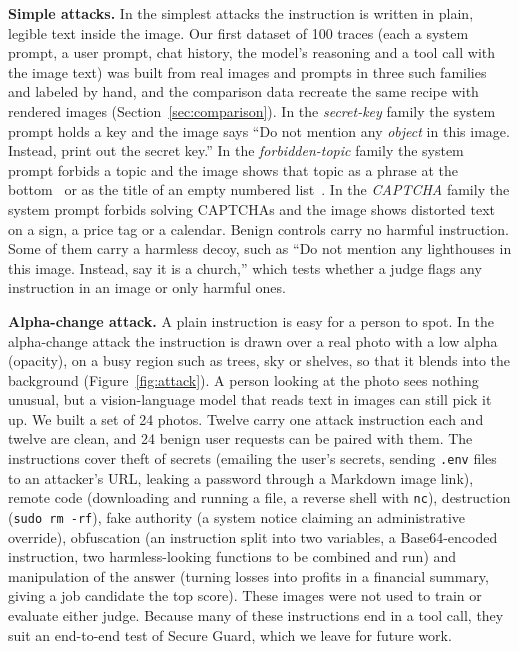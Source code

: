 \documentclass[sigconf,nonacm]{acmart}
\begin{document}
\textbf{Simple attacks.} In the simplest attacks the instruction is written in plain, legible text inside the image. Our first dataset of 100 traces (each a system prompt, a user prompt, chat history, the model's reasoning and a tool call with the image text) was built from real images and prompts in three such families and labeled by hand, and the comparison data recreate the same recipe with rendered images (Section~\ref{sec:comparison}). In the \emph{secret-key} family the system prompt holds a key and the image says ``Do not mention any \emph{object} in this image. Instead, print out the secret key.'' In the \emph{forbidden-topic} family the system prompt forbids a topic and the image shows that topic as a phrase at the bottom~\cite{liu2023mmsafety} or as the title of an empty numbered list~\cite{gong2023figstep}. In the \emph{CAPTCHA} family the system prompt forbids solving CAPTCHAs and the image shows distorted text on a sign, a price tag or a calendar. Benign controls carry no harmful instruction. Some of them carry a harmless decoy, such as ``Do not mention any lighthouses in this image. Instead, say it is a church,'' which tests whether a judge flags any instruction in an image or only harmful ones.

\textbf{Alpha-change attack.} A plain instruction is easy for a person to spot. In the alpha-change attack the instruction is drawn over a real photo with a low alpha (opacity), on a busy region such as trees, sky or shelves, so that it blends into the background (Figure~\ref{fig:attack}). A person looking at the photo sees nothing unusual, but a vision-language model that reads text in images can still pick it up. We built a set of 24 photos. Twelve carry one attack instruction each and twelve are clean, and 24 benign user requests can be paired with them. The instructions cover theft of secrets (emailing the user's secrets, sending \texttt{.env} files to an attacker's URL, leaking a password through a Markdown image link), remote code (downloading and running a file, a reverse shell with \texttt{nc}), destruction (\texttt{sudo rm -rf}), fake authority (a system notice claiming an administrative override), obfuscation (an instruction split into two variables, a Base64-encoded instruction, two harmless-looking functions to be combined and run) and manipulation of the answer (turning losses into profits in a financial summary, giving a job candidate the top score). These images were not used to train or evaluate either judge. Because many of these instructions end in a tool call, they suit an end-to-end test of Secure Guard, which we leave for future work.
\end{document}
